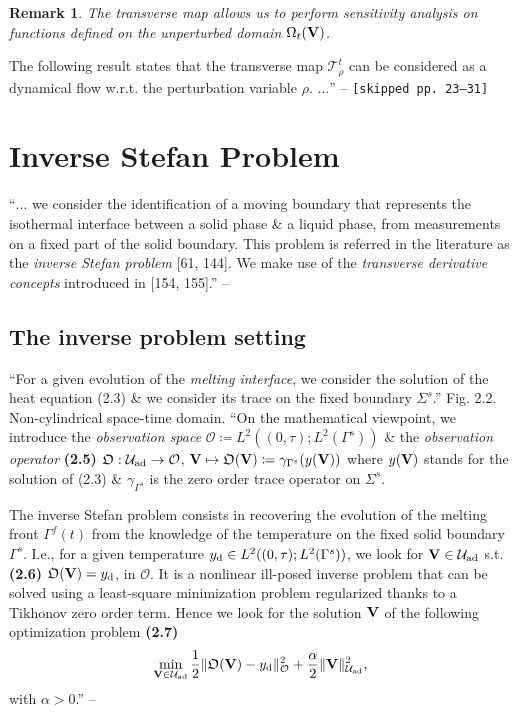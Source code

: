 \documentclass[oneside]{book}
\numberwithin{equation}{section}
\newtheorem{remark}{Remark}[chapter]
\begin{document}
\begin{remark}
	The transverse map allows us to perform sensitivity analysis on functions defined on the unperturbed domain $\Omega_t({\bf V})$.
\end{remark}
The following result states that the transverse map $\mathcal{T}_\rho^t$ can be considered as a dynamical flow w.r.t. the perturbation variable $\rho$. $\ldots$'' -- \cite[Chap. 1, Subsect. 1.4.3, pp. 19--23]{Moubachir_Zolesio2006} \texttt{[skipped pp. 23--31]}

\section{Inverse Stefan Problem}
``$\ldots$ we consider the identification of a moving boundary that represents the isothermal interface between a solid phase \& a liquid phase, from measurements on a fixed part of the solid boundary. This problem is referred in the literature as the \textit{inverse Stefan problem} [61, 144]. We make use of the \textit{transverse derivative concepts} introduced in [154, 155].'' -- \cite[Chap. 2, p. 33]{Moubachir_Zolesio2006}

\subsection{The inverse problem setting}
``For a given evolution of the \textit{melting interface}, we consider the solution of the heat equation (2.3) \& we consider its trace on the fixed boundary $\Sigma^s$.'' \textsf{Fig. 2.2. Non-cylindrical space-time domain.} ``On the mathematical viewpoint, we introduce the \textit{observation space} $\mathcal{O}\coloneqq L^2((0,\tau);L^2(\Gamma^s))$ \& the \textit{observation operator} \textbf{(2.5)} $\mathfrak{O}:\mathcal{U}_{\rm ad}\to\mathcal{O}$, ${\bf V}\mapsto\mathfrak{O}({\bf V})\coloneqq\gamma_{\Gamma^s}(y({\bf V}))$ where $y({\bf V})$ stands for the solution of (2.3) \& $\gamma_{\Gamma^s}$ is the zero order trace operator on $\Sigma^s$.

The inverse Stefan problem consists in recovering the evolution of the melting front $\Gamma^f(t)$ from the knowledge of the temperature on the fixed solid boundary $\Gamma^s$. I.e., for a given temperature $y_{\rm d}\in L^2((0,\tau);L^2(\Gamma^s))$, we look for ${\bf V}\in\mathcal{U}_{\rm ad}$ s.t. \textbf{(2.6)} $\mathfrak{O}({\bf V}) = y_{\rm d}$, in $\mathcal{O}$. It is a nonlinear ill-posed inverse problem that can be solved using a least-square minimization problem regularized thanks to a Tikhonov zero order term. Hence we look for the solution ${\bf V}$ of the following optimization problem \textbf{(2.7)}
\begin{align*}
	\min_{{\bf V}\in\mathcal{U}_{\rm ad}} \frac{1}{2}\|\mathfrak{O}({\bf V}) - y_{\rm d}\|_{\mathcal{O}}^2 + \frac{\alpha}{2}\|{\bf V}\|_{\mathcal{U}_{\rm ad}}^2,
\end{align*}
with $\alpha > 0$.'' -- \cite[Chap. 2, Sect. 2.2, p. 35]{Moubachir_Zolesio2006}
\end{document}
